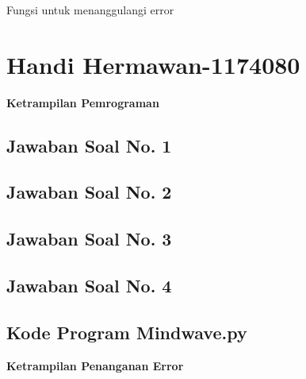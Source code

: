 \hfill \break
Fungsi untuk menanggulangi error



\section{Handi Hermawan-1174080}
\textbf{Ketrampilan Pemrograman}

\subsection{Jawaban Soal No. 1}

\subsection{Jawaban Soal No. 2}

\subsection{Jawaban Soal No. 3}

\subsection{Jawaban Soal No. 4}

\subsection{Kode Program Mindwave.py}
\hfill \break
{\Large \textbf{Ketrampilan Penanganan Error}}

